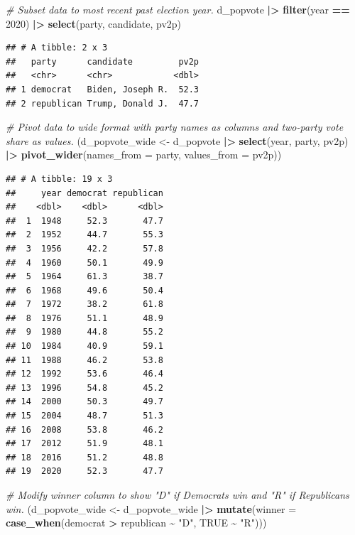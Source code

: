 \documentclass[
]{article}
\newenvironment{Shaded}{\begin{snugshade}}{\end{snugshade}}
\newcommand{\AttributeTok}[1]{\textcolor[rgb]{0.13,0.29,0.53}{#1}}
\newcommand{\CommentTok}[1]{\textcolor[rgb]{0.56,0.35,0.01}{\textit{#1}}}
\newcommand{\ConstantTok}[1]{\textcolor[rgb]{0.56,0.35,0.01}{#1}}
\newcommand{\DecValTok}[1]{\textcolor[rgb]{0.00,0.00,0.81}{#1}}
\newcommand{\FunctionTok}[1]{\textcolor[rgb]{0.13,0.29,0.53}{\textbf{#1}}}
\newcommand{\NormalTok}[1]{#1}
\newcommand{\OtherTok}[1]{\textcolor[rgb]{0.56,0.35,0.01}{#1}}
\newcommand{\SpecialCharTok}[1]{\textcolor[rgb]{0.81,0.36,0.00}{\textbf{#1}}}
\newcommand{\StringTok}[1]{\textcolor[rgb]{0.31,0.60,0.02}{#1}}
\begin{document}
\begin{Shaded}
\begin{Highlighting}[]
\CommentTok{\# Subset data to most recent past election year. }
\NormalTok{d\_popvote }\SpecialCharTok{|\textgreater{}} 
  \FunctionTok{filter}\NormalTok{(year }\SpecialCharTok{==} \DecValTok{2020}\NormalTok{) }\SpecialCharTok{|\textgreater{}} 
  \FunctionTok{select}\NormalTok{(party, candidate, pv2p)}
\end{Highlighting}
\end{Shaded}

\begin{verbatim}
## # A tibble: 2 x 3
##   party      candidate         pv2p
##   <chr>      <chr>            <dbl>
## 1 democrat   Biden, Joseph R.  52.3
## 2 republican Trump, Donald J.  47.7
\end{verbatim}

\begin{Shaded}
\begin{Highlighting}[]
\CommentTok{\# Pivot data to wide format with party names as columns and two{-}party vote share as values.}
\NormalTok{(d\_popvote\_wide }\OtherTok{\textless{}{-}}\NormalTok{ d\_popvote }\SpecialCharTok{|\textgreater{}}
    \FunctionTok{select}\NormalTok{(year, party, pv2p) }\SpecialCharTok{|\textgreater{}}
    \FunctionTok{pivot\_wider}\NormalTok{(}\AttributeTok{names\_from =}\NormalTok{ party, }\AttributeTok{values\_from =}\NormalTok{ pv2p))}
\end{Highlighting}
\end{Shaded}

\begin{verbatim}
## # A tibble: 19 x 3
##     year democrat republican
##    <dbl>    <dbl>      <dbl>
##  1  1948     52.3       47.7
##  2  1952     44.7       55.3
##  3  1956     42.2       57.8
##  4  1960     50.1       49.9
##  5  1964     61.3       38.7
##  6  1968     49.6       50.4
##  7  1972     38.2       61.8
##  8  1976     51.1       48.9
##  9  1980     44.8       55.2
## 10  1984     40.9       59.1
## 11  1988     46.2       53.8
## 12  1992     53.6       46.4
## 13  1996     54.8       45.2
## 14  2000     50.3       49.7
## 15  2004     48.7       51.3
## 16  2008     53.8       46.2
## 17  2012     51.9       48.1
## 18  2016     51.2       48.8
## 19  2020     52.3       47.7
\end{verbatim}

\begin{Shaded}
\begin{Highlighting}[]
\CommentTok{\# Modify winner column to show "D" if Democrats win and "R" if Republicans win. }
\NormalTok{(d\_popvote\_wide }\OtherTok{\textless{}{-}}\NormalTok{ d\_popvote\_wide }\SpecialCharTok{|\textgreater{}} 
    \FunctionTok{mutate}\NormalTok{(}\AttributeTok{winner =} \FunctionTok{case\_when}\NormalTok{(democrat }\SpecialCharTok{\textgreater{}}\NormalTok{ republican }\SpecialCharTok{\textasciitilde{}} \StringTok{"D"}\NormalTok{,}
                              \ConstantTok{TRUE} \SpecialCharTok{\textasciitilde{}} \StringTok{"R"}\NormalTok{)))}
\end{Highlighting}
\end{Shaded}
\end{document}
